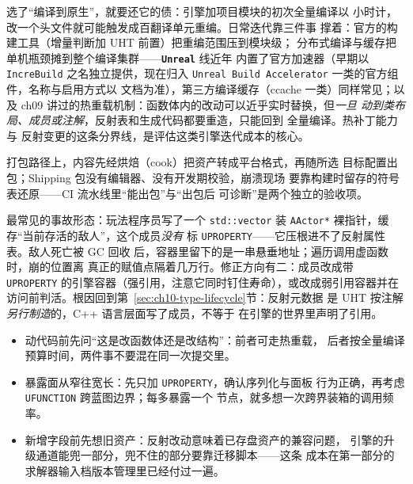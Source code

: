 \documentclass[12pt,a4paper,fontset=fandol]{ctexbook}
\newcommand{\Tp}[1]{\texttt{#1}}
\newcommand{\Lib}[1]{\textbf{\texttt{#1}}}
\newcommand{\Lang}[1]{\textsf{#1}}
\newcommand{\CPP}{\Lang{C++}}
\begin{document}
选了``编译到原生''，就要还它的债：引擎加项目模块的初次全量编译以
小时计，改一个头文件就可能触发成百翻译单元重编。日常迭代靠三件事
撑着：官方的构建工具（增量判断加 UHT 前置）把重编范围压到模块级；
分布式编译与缓存把单机瓶颈摊到整个编译集群——\Lib{Unreal} 线近年
内置了官方加速器（早期以 \Tp{IncreBuild} 之名独立提供，现在归入
\Tp{Unreal Build Accelerator} 一类的官方组件，名称与启用方式以
文档为准），第三方编译缓存（ccache 一类）同样常见；以及 ch09
讲过的热重载机制：函数体内的改动可以近乎实时替换，但\emph{一旦
动到类布局、成员或注解}，反射表和生成代码都要重造，只能回到
全量编译。热补丁能力与
反射变更的这条分界线，是评估这类引擎迭代成本的核心。

打包路径上，内容先经烘焙（cook）把资产转成平台格式，再随所选
目标配置出包；Shipping 包没有编辑器、没有开发期校验，崩溃现场
要靠构建时留存的符号表还原——CI 流水线里``能出包''与``出包后
可诊断''是两个独立的验收项。

\begin{warning}[title={把 UObject 裸指针塞进容器：GC 看不见}]
最常见的事故形态：玩法程序员写了一个 \Tp{std::vector} 装
\Tp{AActor*} 裸指针，缓存``当前存活的敌人''，这个成员\emph{没有}
标 \Tp{UPROPERTY}——它压根进不了反射属性表。敌人死亡被 GC 回收
后，容器里留下的是一串悬垂地址；遍历调用虚函数时，崩的位置离
真正的赋值点隔着几万行。修正方向有二：成员改成带 \Tp{UPROPERTY}
的引擎容器（强引用，注意它同时钉住寿命），或改成弱引用容器并在
访问前判活。根因回到第~\ref{sec:ch10-type-lifecycle}节：反射元数据
是 UHT 按注解\emph{另行制造}的，\CPP{} 语言层面写了成员，不等于
在引擎的世界里声明了引用。
\end{warning}

\begin{bestpractice}[title={在这类工程里控制迭代成本的次序}]
\begin{itemize}
\item 动代码前先问``这是改函数体还是改结构''：前者可走热重载，
      后者按全量编译预算时间，两件事不要混在同一次提交里。
\item 暴露面从窄往宽长：先只加 \Tp{UPROPERTY}，确认序列化与面板
      行为正确，再考虑 \Tp{UFUNCTION} 跨蓝图边界；每多暴露一个
      节点，就多想一次跨界装箱的调用频率。
\item 新增字段前先想旧资产：反射改动意味着已存盘资产的兼容问题，
      引擎的升级通道能兜一部分，兜不住的部分要靠迁移脚本——这条
      成本在第一部分的求解器输入档版本管理里已经付过一遍。
\end{itemize}
\end{bestpractice}

\end{document}
